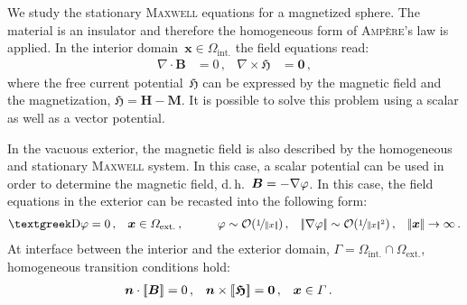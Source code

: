 We study the stationary \textsc{Maxwell} equations for a magnetized sphere. The material is an insulator and therefore the homogeneous form of \textsc{Ampère}'s law is applied. In the interior domain~$\bm{\bm{x}}\in\varOmega_{\mathrm{int.}}$ the field equations read:
\begin{equation}
\begin{aligned}
	\nabla\cdot\bm{B}&=0\,, & \nabla\times\bm{\mathfrak{H}}&=\bm{0}\,,
\end{aligned}
\end{equation}
where the free current potential~$\bm{\mathfrak{H}}$ can be expressed by the magnetic field and the magnetization, \ie $\bm{\mathfrak{H}}=\bm{H}-\bm{M}$. It is possible to solve this problem using a scalar as well as a vector potential.

In the vacuous exterior, the magnetic field is also described by the homogeneous and stationary \textsc{Maxwell} system. In this case, a scalar potential can be used in order to determine the magnetic field, d.\,h.\ $\bm{B}=-\nabla \varphi$. In this case, the field equations in the exterior can be recasted into the following form:
\begin{equation}
\begin{aligned}
	\laplace \vp&=0\,, & \bm{x}&\in\varOmega_\mathrm{ext.}\,, \qquad&
	\vp&\sim \mathcal{O}(\nicefrac{1}{\norm{x}})\,, &
	\norm{\nabla \vp}&\sim \mathcal{O}(\nicefrac{1}{\norm{x}^2})\,, &
	\norm{\bm{x}}\to \infty\,.
\end{aligned}
\end{equation}
At interface between the interior and the exterior domain, $\varGamma=\varOmega_\mathrm{int.}\cap\varOmega_\mathrm{ext.}$, homogeneous transition conditions hold:
\begin{equation}\label{eqn:JumpCondition}
\begin{aligned}
	\bm{n}\cdot\left[\!\left[\bm{B}\right]\!\right]&=0\,, &
	\bm{n}\times\left[\!\left[\bm{\mathfrak{H}}\right]\!\right]&=\bm{0}\,, &
	\bm{x}&\in\varGamma\,.
\end{aligned}
\end{equation}


